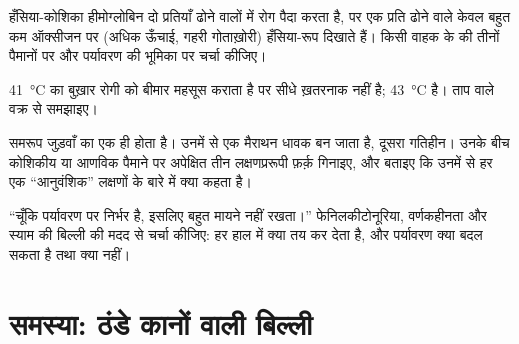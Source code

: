 \begin{exercise}[$\star\star\star$]\label{exo:g11:enzymes-and-phenotype:12}
हँसिया-कोशिका हीमोग्लोबिन दो प्रतियाँ ढोने वालों में रोग पैदा करता है, पर
एक प्रति ढोने वाले केवल बहुत कम ऑक्सीजन पर (अधिक ऊँचाई, गहरी गोताख़ोरी)
हँसिया-रूप दिखाते हैं। किसी वाहक के  की तीनों पैमानों पर और
पर्यावरण की भूमिका पर चर्चा कीजिए।
\end{exercise}

\begin{exercise}[$\star\star\star$]\label{exo:g11:enzymes-and-phenotype:13}
\qty{41}{\celsius} का बुख़ार रोगी को बीमार महसूस कराता है पर सीधे ख़तरनाक
नहीं है; \qty{43}{\celsius} है। ताप वाले वक्र से समझाइए।
\end{exercise}

\begin{exercise}[$\star\star\star$]\label{exo:g11:enzymes-and-phenotype:14}
समरूप जुड़वाँ का  एक ही होता है। उनमें से एक मैराथन धावक बन जाता
है, दूसरा गतिहीन। उनके बीच कोशिकीय या आणविक पैमाने पर अपेक्षित तीन
लक्षणप्ररूपी फ़र्क़ गिनाइए, और बताइए कि उनमें से हर एक ``आनुवंशिक'' लक्षणों
के बारे में क्या कहता है।
\end{exercise}

\begin{exercise}[$\star\star\star$]\label{exo:g11:enzymes-and-phenotype:15}
``चूँकि  पर्यावरण पर निर्भर है, इसलिए  बहुत मायने नहीं
रखता।'' फेनिलकीटोनूरिया, वर्णकहीनता और स्याम की बिल्ली की मदद से चर्चा
कीजिए: हर हाल में  क्या तय कर देता है, और पर्यावरण क्या बदल सकता
है तथा क्या नहीं।
\end{exercise}

\section{समस्या: ठंडे कानों वाली बिल्ली}

